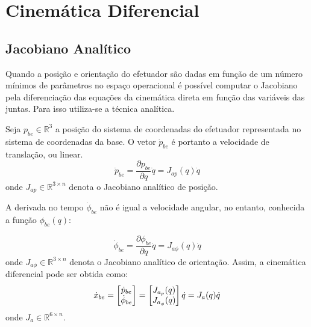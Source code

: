 \section{Cinemática Diferencial}

\subsection{Jacobiano Analítico}
Quando a posição e orientação do efetuador são dadas em função de um número mínimos de parâmetros no espaço operacional é possível computar o Jacobiano pela diferenciação das equações da cinemática direta em função das variáveis das juntas.
Para isso utiliza-se a técnica analítica.

Seja ${p}_{be} \in \mathbb{R}^3$ a posição do sistema de coordenadas do efetuador representada no sistema de coordenadas da base. O vetor $\dot{{p}}_{be}$ é portanto a velocidade de translação, ou linear.
\begin{equation} \label{eq:jacob_pos}
\dot{{p}}_{be} = \frac{\partial {p}_{be} }{\partial {q}} {\dot{q}} = {J}_{ap} ({q}) {\dot{q}} 
\end{equation}
onde ${J}_{ap} \in \mathbb{R}^{3 \times n} $ denota o Jacobiano analítico de posição.

A derivada no tempo $\dot{{\phi}}_{be}$ não é igual a velocidade angular, no entanto, conhecida a função ${\phi}_{be}({q})$:

\begin{equation} \label{eq:jacob_or}
\dot{{\phi}}_{be} = \frac{\partial {\phi}_{be}}{\partial {q}} {\dot{q}} = {J}_{a\phi}({q}){\dot{q}}
\end{equation}
onde ${J}_{a\phi}  \in \mathbb{R}^{3 \times n} $ denota o Jacobiano analítico de orientação. Assim, a cinemática diferencial pode ser obtida como:
\begin{equation} \label{eq:jacoba}
\dot{x}_{be} = \begin{bmatrix} \dot{p}_{be} \\ \dot{\phi}_{be} \end{bmatrix} = \begin{bmatrix} J_{a_p}(q) \\ J_{a_\phi}(q)\end{bmatrix} {\dot{q}} = {J}_a ({q}) \dot{{q}}
\end{equation}
onde ${J}_{a}  \in \mathbb{R}^{6 \times n} $.
 

